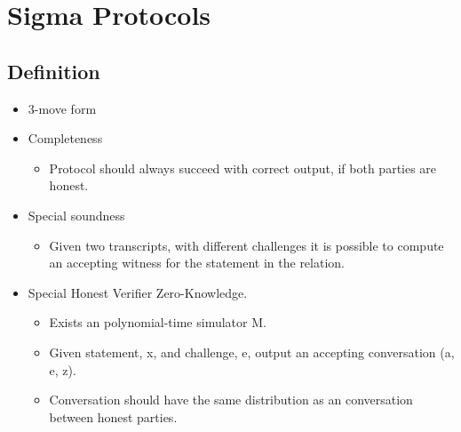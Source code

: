 \section{Sigma Protocols}

\subsection{Definition}
\begin{itemize}
  \item 3-move form
  \item Completeness
    \begin{itemize}
      \item Protocol should always succeed with correct output, if both parties are honest.
    \end{itemize}
  \item Special soundness
    \begin{itemize}
      \item Given two transcripts, with different challenges it is possible to
        compute an accepting witness for the statement in the relation.
    \end{itemize}
  \item Special Honest Verifier Zero-Knowledge.
    \begin{itemize}
      \item Exists an polynomial-time simulator M.
      \item Given statement, x, and challenge, e, output an accepting
        conversation (a, e, z).
      \item Conversation should have the same distribution as an conversation
        between honest parties.
    \end{itemize}
\end{itemize}



